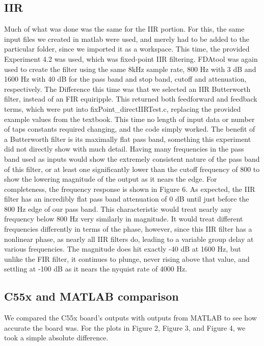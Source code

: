 \documentclass{bannerReport}
\begin{document}
\subsection{IIR}
Much of what was done was the same for the IIR portion. For this, the same input files we created in matlab were used, and merely had to be added to the particular folder, since we imported it as a workspace. This time, the provided Experiment 4.2 was used, which was fixed-point IIR filtering. FDAtool was again used to create the filter using the same 8kHz sample rate, 800 Hz with 3 dB and 1600 Hz with 40 dB for the pass band and stop band, cutoff and attenuation, respectively. The Difference this time was that we selected an IIR Butterworth filter, instead of an FIR equiripple. This returned both feedforward and feedback terms, which were put into {\mono fixPoint\_directIIRTest.c}, replacing the provided example values from the textbook. This time no length of input data or number of taps constants required changing, and the code simply worked. 
The benefit of a Butterworth filter is its maximally flat pass band, something this experiment did not directly show with much detail. Having many frequencies in the pass band used as inputs would show the extremely consistent nature of the pass band of this filter, or at least one significantly lower than the cutoff frequency of 800 to show the lowering magnitude of the output as it nears the edge. For completeness, the frequency response is shown in Figure 6. As expected, the IIR filter has an incredibly flat pass band attenuation of 0 dB until just before the 800 Hz edge of our pass band. This characteristic would treat nearly any frequency below 800 Hz very similarly in magnitude. It would treat different frequencies differently in terms of the phase, however, since this IIR filter has a nonlinear phase, as nearly all IIR filters do, leading to a variable group delay at various frequencies. The magnitude does hit exactly -40 dB at 1600 Hz, but unlike the FIR filter, it continues to plunge, never rising above that value, and settling at -100 dB as it nears the nyquist rate of 4000 Hz.

\subsection{C55x and MATLAB comparison}
We compared the C55x board's outputs with outputs from MATLAB to see how accurate the board was. For the plots in Figure 2, Figure 3, and Figure 4, we took a simple absolute difference.
\end{document}

